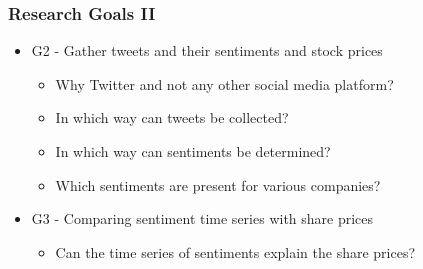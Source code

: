 \begin{frame}
    \frametitle{Research Goals II}
    
    \begin{itemize}

        \item G2 - Gather tweets and their sentiments and stock prices
        
        \begin{itemize}
            \item Why Twitter and not any other social media platform?
            \item In which way can tweets be collected?
            \item In which way can sentiments be determined?
            \item Which sentiments are present for various companies?
        \end{itemize}

        \item G3 - Comparing sentiment time series with share prices
        
        \begin{itemize}
            \item Can the time series of sentiments explain the share prices?
        \end{itemize}

    \end{itemize}
\end{frame}